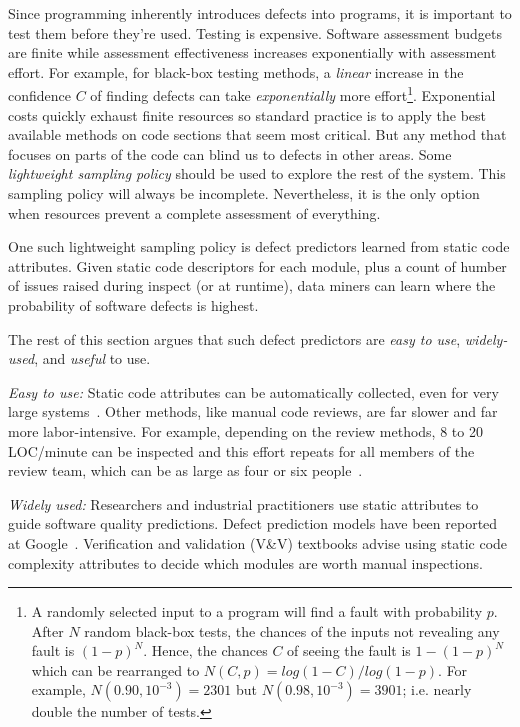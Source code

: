 Since programming inherently
introduces defects into  programs, it is important to test them before they're used.
Testing is expensive.
Software assessment budgets are finite
while assessment effectiveness increases 
exponentially with assessment effort.
For example, for  black-box testing methods,
a {\em linear} increase
in the confidence $C$ of finding  defects
can take {\em exponentially} more effort\footnote{A randomly selected 
input to a program will find a fault with probability $p$.
After $N$ random black-box tests, the chances of the inputs 
not revealing any fault 
is $(1-p)^N$. Hence, the chances $C$ of seeing the fault is $1-(1-p)^N$
which can be rearranged to 
 $N(C,p)=log(1 -
C)/log(1-p)$. For example, $N(0.90,10^{-3})=2301$
but $N(0.98,10^{-3})=3901$; i.e. nearly double the number of tests.}.
Exponential costs quickly exhaust finite resources so
standard practice is to apply the best
available  methods on code sections that seem   most critical. 
But 
any method that focuses on parts of the code
can blind us to defects in other areas. Some  {\em
lightweight sampling policy} should be used to explore the rest of the system.  This
sampling policy will always be incomplete.
Nevertheless, it is the only option when
resources prevent a complete assessment of everything.

One such lightweight sampling policy is defect predictors learned from static code attributes.
Given static code descriptors for each module, plus a count of humber of issues raised during inspect (or at runtime),
data miners can
learn where the probability of software defects is highest.



The rest of this section argues that such defect predictors are   {\em easy to
use}, {\em widely-used}, and {\em useful} to use.

{\em Easy to use:} Static code attributes can be automatically collected, even for very large systems~\cite{nagappan05}.
Other methods, like  manual code reviews, are far slower and far more labor-intensive.
For example, depending on the review methods, 8 to 20 LOC/minute can be
inspected and this effort repeats for all members of the review team,
which can be as large as four or six people~\cite{me02f}. 

{\em Widely used:}  Researchers and industrial practitioners  use static attributes to guide software 
quality predictions.
 Defect prediction models have been reported
  at Google~\cite{lewis13}.
Verification and validation (V\&V) textbooks
\cite{rakitin01} advise using static code complexity attributes
to decide which modules are worth manual inspections.  


